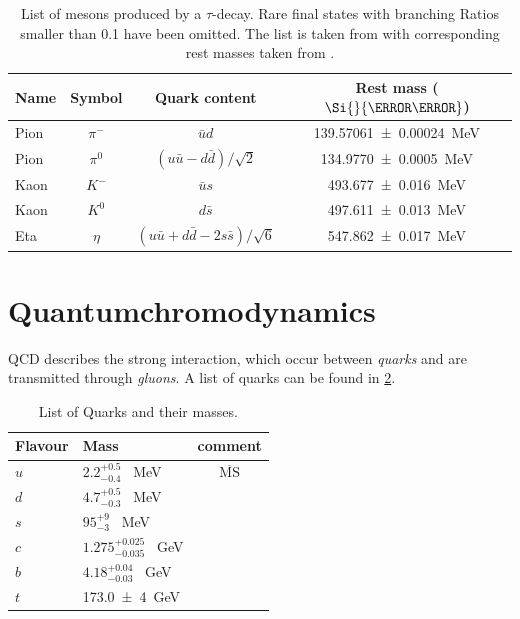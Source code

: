 \documentclass[../../index.tex]{subfiles}
\begin{document}
\begin{table}
  \label{table:lightMesons}
  \centering
  \begin{tabular}{l c c c}
    \toprule
    Name & Symbol & Quark content & Rest mass ($\Si{}{\mega\electronvolt}$) \\
    \midrule
    Pion & $\pi^-$ & $\bar u d$ & \SI{139.57061 \pm 0.00024}{\mega\electronvolt}  \\
    Pion & $\pi^0$ & $(u \bar u - d \bar d)/\sqrt{2}$ & \SI{134.9770\pm0.0005}{\mega\electronvolt} \\
    Kaon & $K^-$ & $\bar u s$ & \SI{493.677\pm0.016}{\mega\electronvolt} \\
    Kaon & $K^0$ & $d \bar s$ & \SI{497.611\pm0.013}{\mega\electronvolt} \\
    Eta & $\eta$ & $(u \bar u + d \bar d - 2 s \bar s)/\sqrt{6}$ & \SI{547.862\pm0.017}{\mega\electronvolt} \\
  \end{tabular}
  \caption{List of mesons produced by a $\tau$-decay. Rare final states with
    branching Ratios smaller than 0.1 have been omitted. The list is taken from 
    \cite{Davier2006} with corresponding rest masses taken from \cite{PDG2018}.}
\end{table}


\section{Quantumchromodynamics}
\label{sec:quantumchromodynamics}
QCD describes the strong interaction, which occur between \textit{quarks} and
are transmitted through \textit{gluons}. A list of quarks can be found in
\ref{table:quarkList}.
\begin{table}
  \label{table:quarkList}
  \centering
  \begin{tabular}{l l c}
    \toprule
    Flavour & Mass & comment\\
    \midrule
    $u$ & $2.2_{-0.4}^{+0.5}$ \SI{}{\mega\eV} & $\overline{\text{MS}}$ \\
    $d$ & $4.7_{-0.3}^{+0.5}$ \SI{}{\mega\eV} \\
    $s$ & $95_{-3}^{+9}$ \SI{}{\mega\eV}  \\
    $c$ & $1.275_{-0.035}^{+0.025}$ \SI{}{\giga\eV} \\
    $b$ & $4.18_{-0.03}^{+0.04}$ \SI{}{\giga\eV} \\
    $t$ & \SI{173.0 \pm 4}{\giga\eV} \\
    \bottomrule 
  \end{tabular}
  \caption{List of Quarks and their masses\cite{PDG2018}.}
\end{table}
\end{document}
